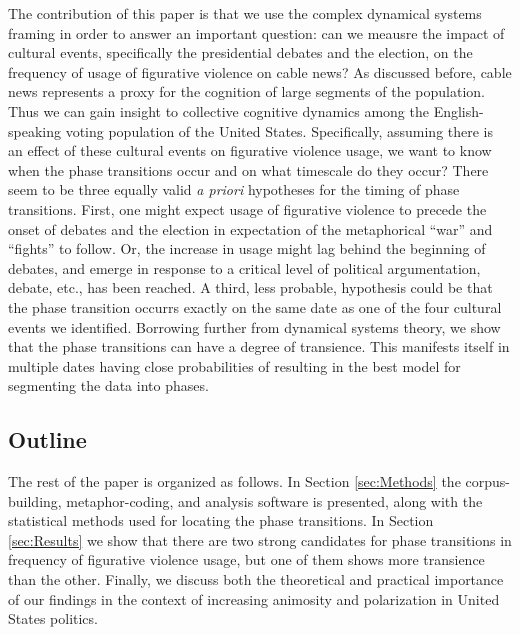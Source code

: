 The contribution of this paper is that we use the complex dynamical systems
framing in order to answer an important question: can we meausre the
impact of cultural
events, specifically the presidential debates and the election, on the
frequency of usage of figurative violence on cable news? As discussed before,
cable news represents a proxy for the cognition of large segments of the
population. Thus we can gain insight to collective cognitive dynamics among
the English-speaking voting population of the United States. Specifically,
assuming there is an effect of these cultural events on figurative violence usage,
we want to know when the phase transitions occur and on what timescale do they
occur? There seem to be three equally valid \textit{a priori} hypotheses for
the timing of phase transitions. First, one might expect usage of figurative
violence to precede the onset of debates and the election in expectation of the
metaphorical ``war'' and ``fights'' to follow. Or, the increase in usage
might lag behind the beginning of debates, and emerge in response to a 
critical level of political argumentation, debate, etc., has been reached.
A third, less probable, hypothesis could be that the phase transition occurrs
exactly on the same date as one of the four cultural events we identified.
Borrowing further from dynamical systems theory, we show that the phase
transitions can have a degree of transience. This manifests itself in multiple
dates having close probabilities of resulting in the best model for segmenting
the data into phases.

\subsection{Outline}
\label{sub:Outline}

The rest of the paper is organized as follows. In Section \ref{sec:Methods}
the corpus-building, metaphor-coding, and analysis software is presented,
along with the statistical methods used for locating the phase transitions.
In Section \ref{sec:Results} we show that there are two strong candidates
for phase transitions in frequency of figurative violence usage, but one of
them shows more transience than the other. Finally, we discuss both the
theoretical and practical importance of our findings in the context of
increasing animosity and polarization in United States politics.


